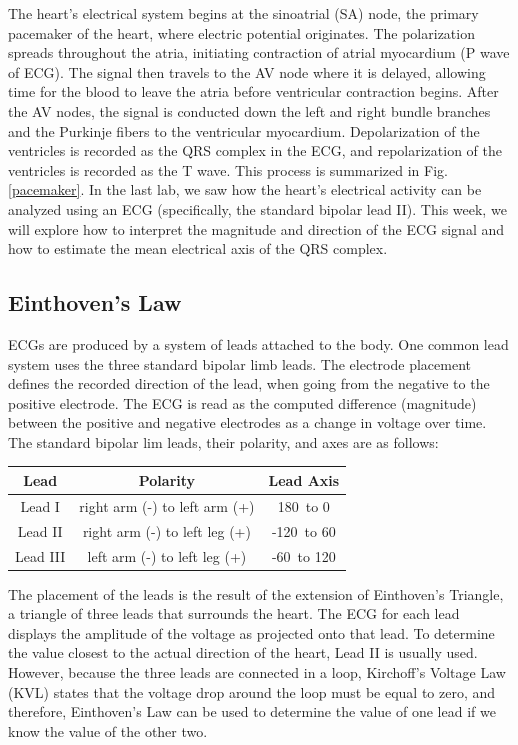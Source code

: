 \documentclass{article}
\begin{document}
The heart's electrical system begins at the sinoatrial (SA) node, the primary pacemaker of the heart, where electric potential originates. The polarization spreads throughout the atria, initiating contraction of atrial myocardium (P wave of ECG). The signal then travels to the AV node where it is delayed, allowing time for the blood to leave the atria before ventricular contraction begins. After the AV nodes, the signal is conducted down the left and right bundle branches and the Purkinje fibers to the ventricular myocardium. Depolarization of the ventricles is recorded as the QRS complex in the ECG, and repolarization of the ventricles is recorded as the T wave. This process is summarized in Fig. \ref{pacemaker}. In the last lab, we saw how the heart's electrical activity can be analyzed using an ECG (specifically, the standard bipolar lead II). This week, we will explore how to interpret the magnitude and direction of the ECG signal and how to estimate the mean electrical axis of the QRS complex.

\subsection*{Einthoven's Law}
ECGs are produced by a system of leads attached to the body. One common lead system uses the three standard bipolar limb leads. The electrode placement defines the recorded direction of the lead, when going from the negative to the positive electrode. The ECG is read as the computed difference (magnitude) between the positive and negative electrodes as a change in voltage over time.\\

The standard bipolar lim leads, their polarity, and axes are as follows:
\begin{table}[h]
	\centering
	\begin{tabular}[h!]{ccc}
	\toprule
	Lead & Polarity & Lead Axis\\
	\midrule
	Lead I & right arm (-) to left arm (+) & 180\textdegree\ to 0\textdegree\\
	 Lead II & right arm (-) to left leg (+) & -120\textdegree\ to 60\textdegree\\
	 Lead III & left arm (-) to left leg (+) & -60\textdegree\ to 120\textdegree\\
	\bottomrule
	\end{tabular}
	\end{table}

The placement of the leads is the result of the extension of Einthoven's Triangle, a triangle of three leads that surrounds the heart. The ECG for each lead displays the amplitude of the voltage as projected onto that lead. To determine the value closest to the actual direction of the heart, Lead II is usually used. However, because the three leads are connected in a loop, Kirchoff's Voltage Law (KVL) states that the voltage drop around the loop must be equal to zero, and therefore, Einthoven's Law can be used to determine the value of one lead if we know the value of the other two.
\end{document}
